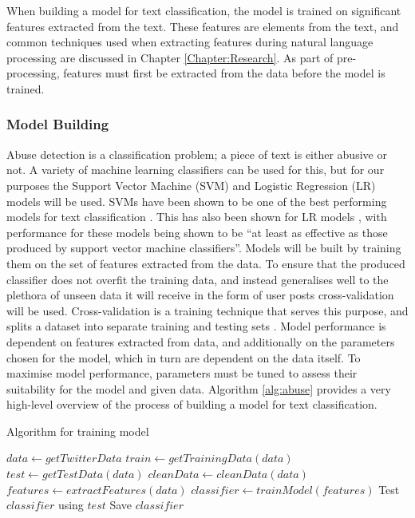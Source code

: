 When building a model for text classification, the model is trained on significant features extracted from the text. These features are elements from the text, and common techniques used when extracting features during natural language processing are discussed in Chapter \ref{Chapter:Research}. As part of pre-processing, features must first be extracted from the data before the model is trained.

\subsubsection{Model Building}
Abuse detection is a classification problem; a piece of text is either abusive or not. A variety of machine learning classifiers can be used for this, but for our purposes the Support Vector Machine (SVM) and Logistic Regression (LR) models will be used. SVMs have been shown to be one of the best performing models for text classification \cite{joachims1998text}. This has also been shown for LR models \cite{genkin2007large}, with performance for these models being shown to be ``at least as effective as those produced by support vector machine classifiers''. Models will be built by training them on the set of features extracted from the data. To ensure that the produced classifier does not overfit the training data, and instead generalises well to the plethora of unseen data it will receive in the form of user posts cross-validation will be used. Cross-validation is a training technique that serves this purpose, and splits a dataset into separate training and testing sets \cite{scikit:cross-val}. Model performance is dependent on features extracted from data, and additionally on the parameters chosen for the model, which in turn are dependent on the data itself. To maximise model performance, parameters must be tuned to assess their suitability for the model and given data. Algorithm \ref{alg:abuse} provides a very high-level overview of the process of building a model for text classification.

\begin{algorithm}
\caption{Algorithm for training model}
\label{alg:abuse}
\begin{algorithmic}[1]
\State $data\gets getTwitterData$
\State $train\gets getTrainingData(data)$
\State $test\gets getTestData(data)$
\State $cleanData\gets cleanData(data)$
\State $features\gets extractFeatures(data)$
\State $classifier\gets trainModel(features)$
\State Test $classifier$ using $test$
\State Save $classifier$
\end{algorithmic}
\end{algorithm}


